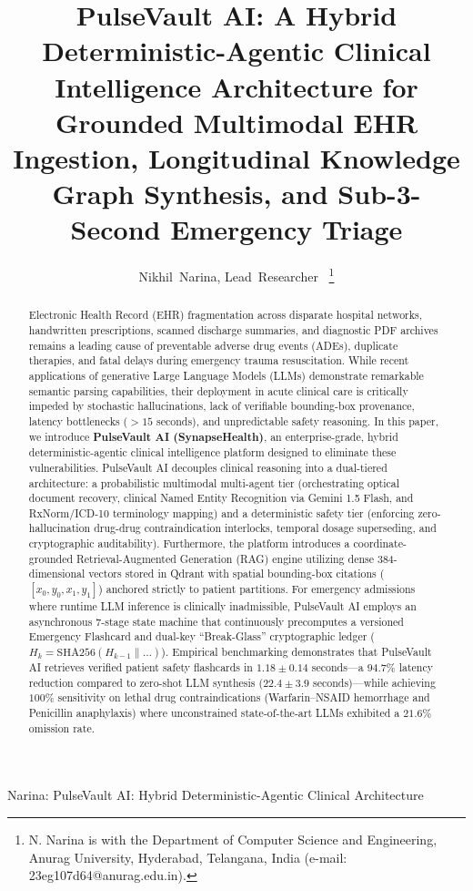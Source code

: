 \documentclass[journal]{IEEEtran}
\begin{document}
\title{PulseVault AI: A Hybrid Deterministic-Agentic Clinical Intelligence Architecture for Grounded Multimodal EHR Ingestion, Longitudinal Knowledge Graph Synthesis, and Sub-3-Second Emergency Triage}

\author{Nikhil~Narina,
        Lead~Researcher~
\thanks{N. Narina is with the Department of Computer Science and Engineering, Anurag University, Hyderabad, Telangana, India (e-mail: 23eg107d64@anurag.edu.in).}}

%
{Narina: PulseVault AI: Hybrid Deterministic-Agentic Clinical Architecture}

\maketitle

\begin{abstract}
Electronic Health Record (EHR) fragmentation across disparate hospital networks, handwritten prescriptions, scanned discharge summaries, and diagnostic PDF archives remains a leading cause of preventable adverse drug events (ADEs), duplicate therapies, and fatal delays during emergency trauma resuscitation. While recent applications of generative Large Language Models (LLMs) demonstrate remarkable semantic parsing capabilities, their deployment in acute clinical care is critically impeded by stochastic hallucinations, lack of verifiable bounding-box provenance, latency bottlenecks ($>15$ seconds), and unpredictable safety reasoning. In this paper, we introduce \textbf{PulseVault AI (SynapseHealth)}, an enterprise-grade, hybrid deterministic-agentic clinical intelligence platform designed to eliminate these vulnerabilities. PulseVault AI decouples clinical reasoning into a dual-tiered architecture: a probabilistic multimodal multi-agent tier (orchestrating optical document recovery, clinical Named Entity Recognition via Gemini 1.5 Flash, and RxNorm/ICD-10 terminology mapping) and a deterministic safety tier (enforcing zero-hallucination drug-drug contraindication interlocks, temporal dosage superseding, and cryptographic auditability). Furthermore, the platform introduces a coordinate-grounded Retrieval-Augmented Generation (RAG) engine utilizing dense 384-dimensional vectors stored in Qdrant with spatial bounding-box citations ($[x_0, y_0, x_1, y_1]$) anchored strictly to patient partitions. For emergency admissions where runtime LLM inference is clinically inadmissible, PulseVault AI employs an asynchronous 7-stage state machine that continuously precomputes a versioned Emergency Flashcard and dual-key ``Break-Glass'' cryptographic ledger ($H_k = \text{SHA256}(H_{k-1} \parallel \dots)$). Empirical benchmarking demonstrates that PulseVault AI retrieves verified patient safety flashcards in $1.18 \pm 0.14$ seconds---a $94.7\%$ latency reduction compared to zero-shot LLM synthesis ($22.4 \pm 3.9$ seconds)---while achieving $100\%$ sensitivity on lethal drug contraindications (Warfarin--NSAID hemorrhage and Penicillin anaphylaxis) where unconstrained state-of-the-art LLMs exhibited a $21.6\%$ omission rate.
\end{abstract}
\end{document}
